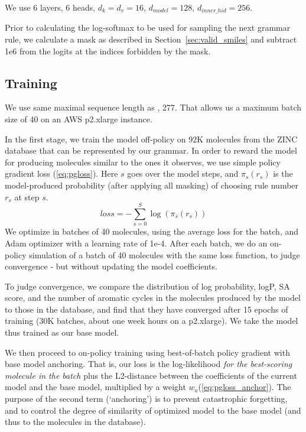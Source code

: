 \documentclass[11pt]{article}
\begin{document}
We use 6 layers, 6 heads, $d_k=d_v=16$, $d_{model}=128$, $d_{inner\_hid}=256$.

Prior to calculating the log-softmax to be used for sampling the next grammar rule, we calculate a mask as described in Section~\ref{sec:valid_smiles} and subtract 1e6 from the logits at the indices forbidden by the mask. 
\subsection{Training}\label{sec:training}
We use same maximal sequence length as \cite{kusner17}, 277.
That allows us a maximum batch size of 40 on an AWS p2.xlarge instance. 

In the first stage, we train the model off-policy on 92K molecules from the ZINC database  \cite{Weininger88} that can be represented by our grammar.  In order to reward the model for producing molecules similar to the ones it observes, we use simple policy gradient loss (\ref{eq:pgloss}). Here $s$ goes over the model steps, and $\pi_s\left(r_s\right)$ is the model-produced probability (after applying all masking) of choosing rule number $r_s$ at step $s$.
\begin{equation}\label{eq:pgloss}
loss = -\sum_{s=0}^S \log\left(\pi_s\left(r_s\right)\right)
\end{equation}
We optimize in batches of 40 molecules, using the average loss for the batch, and Adam optimizer with a learning rate of 1e-4. After each batch, we do an on-policy simulation of a batch of 40 molecules with the same loss function, to judge convergence - but without updating the model coefficients.

To judge convergence, we compare the distribution of log probability, logP, SA score, and the number of aromatic cycles in the molecules produced by the model to those in the database, and find that they have converged after 15 epochs of training (30K batches, about one week hours on a p2.xlarge). We take the model thus trained as our base model.


We then proceed to on-policy training using best-of-batch policy gradient with base model anchoring. That is, our loss is the log-likelihood \emph{for the best-scoring molecule in the batch} plus the L2-distance between the coefficients of the current model and the base model, multiplied by a weight $w_a$(\ref{eq:pgloss_anchor}). The purpose of the second term (`anchoring') is to prevent catastrophic forgetting, and to control the degree of similarity of optimized model to the base model (and thus to the molecules in the database).
\end{document}
